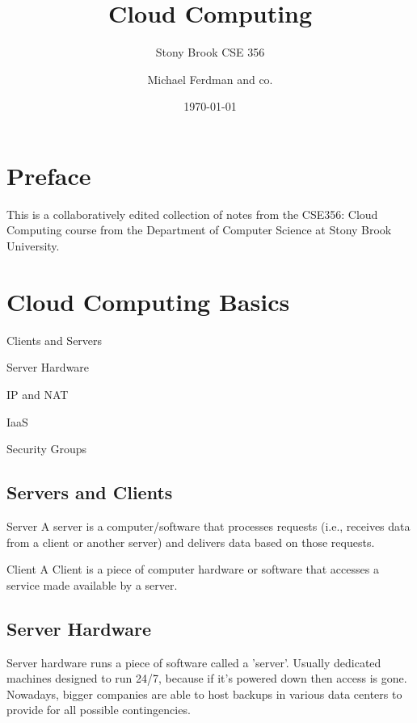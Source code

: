 \documentclass[fancy,11pt,titlestyle=display]{style/elegantbook}
\title{Cloud Computing}
\subtitle{Stony Brook CSE 356}
\author{Michael Ferdman and co.}
\institute{Stony Brook University}
\date{\today}
\begin{document}
\maketitle
\tableofcontents
\clearpage
\thispagestyle{empty}
\mainmatter
\hypersetup{pageanchor=true}

\chapter*{Preface}

This is a collaboratively edited collection of notes from the CSE356: Cloud Computing course from the Department of Computer Science at Stony Brook University.

\chapter{Cloud Computing Basics}

\begin{introduction}[Topics]
\item Clients and Servers
\item Server Hardware
\item IP and NAT
\item IaaS
\item Security Groups
\end{introduction}

\section{Servers and Clients}

\begin{definition}{Server}{}
A server is a computer/software that processes requests (i.e., receives data from a client or another server) and delivers data based on those requests.
\end{definition}

\begin{definition}{Client}{}
A Client is a piece of computer hardware or software that accesses a service made available by a server.
\end{definition}

\section{Server Hardware}

Server hardware runs a piece of software called a 'server'.
Usually dedicated machines designed to run 24/7, because if it's powered down then access is gone. Nowadays, bigger companies are able to host backups in various data centers to provide for all possible contingencies.
\end{document}
